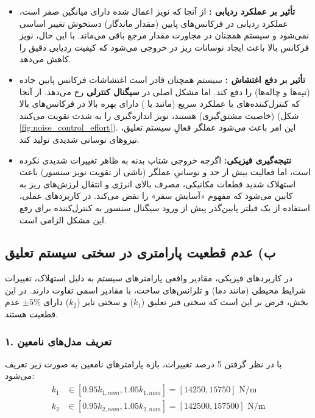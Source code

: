 \documentclass[a4paper]{article}
\begin{document}
\begin{itemize}
	\item \textbf{تأثیر بر عملکرد ردیابی :} 
	از آنجا که نویز اعمال شده دارای میانگین صفر است، عملکرد ردیابی در فرکانس‌های پایین (مقدار ماندگار) دستخوش تغییر اساسی نمی‌شود و سیستم همچنان در مجاورت مقدار مرجع باقی می‌ماند. با این حال، نویز فرکانس بالا باعث ایجاد نوسانات ریز  در خروجی می‌شود که کیفیت ردیابی دقیق را کاهش می‌دهد.
	
	\item \textbf{تأثیر بر دفع اغتشاش :} 
	سیستم همچنان قادر است اغتشاشات فرکانس پایین جاده (تپه‌ها و چاله‌ها) را دفع کند. اما مشکل اصلی در \textbf{سیگنال کنترلی } رخ می‌دهد. از آنجا که کنترل‌کننده‌های با عملکرد سریع (مانند  یا ) دارای بهره بالا در فرکانس‌های بالا (خاصیت مشتق‌گیری) هستند، نویز اندازه‌گیری را به شدت تقویت می‌کنند (شکل \ref{fig:noise_control_effort}). این امر باعث می‌شود عملگر فعالِ سیستم تعلیق، نیروهای نوسانی شدیدی تولید کند.
	
	\item \textbf{نتیجه‌گیری فیزیکی:} 
	اگرچه خروجی شتاب بدنه به ظاهر تغییرات شدیدی نکرده است، اما فعالیت بیش از حد و نوسانیِ عملگر (ناشی از تقویت نویز سنسور) باعث استهلاک شدید قطعات مکانیکی، مصرف بالای انرژی و انتقال لرزش‌های ریز به کابین می‌شود که مفهوم «آسایش سفر» را نقض می‌کند. در کاربردهای عملی، استفاده از یک فیلتر پایین‌گذر  پیش از ورود سیگنال سنسور به کنترل‌کننده برای رفع این مشکل الزامی است.
\end{itemize}
\subsection{ب) عدم قطعیت پارامتری در سختی سیستم تعلیق }

در کاربردهای فیزیکی، مقادیر واقعی پارامترهای سیستم به دلیل استهلاک، تغییرات شرایط محیطی (مانند دما) و تلرانس‌های ساخت، با مقادیر اسمی  تفاوت دارند. در این بخش، فرض بر این است که سختی فنر تعلیق ($k_1$) و سختی تایر ($k_2$) دارای $\pm 5\%$ عدم قطعیت هستند.

\subsubsection*{۱. تعریف مدل‌های نامعین }
با در نظر گرفتن 5 درصد تغییرات، بازه پارامترهای نامعین به صورت زیر تعریف می‌شود:
\begin{align}
	k_1 &\in [0.95 k_{1,nom}, 1.05 k_{1,nom}] = [14250, 15750] \text{ N/m} \\
	k_2 &\in [0.95 k_{2,nom}, 1.05 k_{2,nom}] = [142500, 157500] \text{ N/m}
\end{align}
\end{document}

